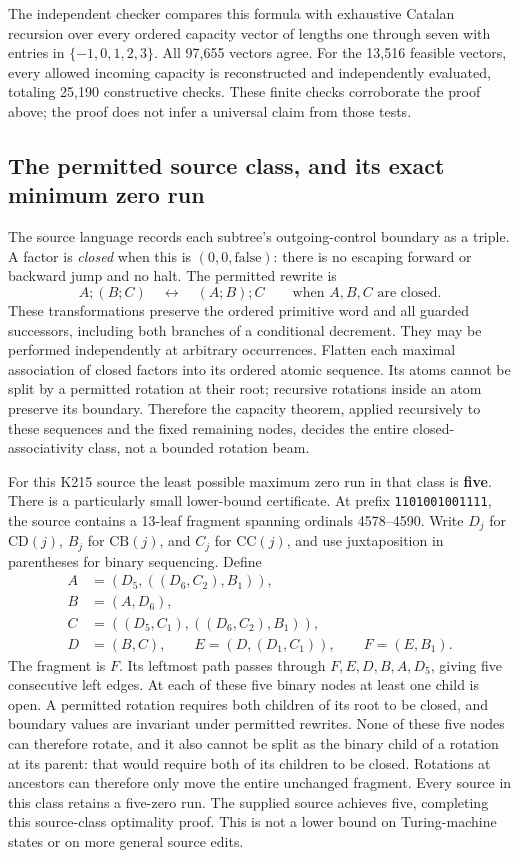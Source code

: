The independent checker compares this formula with exhaustive Catalan
recursion over every ordered capacity vector of lengths one through seven
with entries in $\{-1,0,1,2,3\}$.  All 97,655 vectors agree.  For the 13,516
feasible vectors, every allowed incoming capacity is reconstructed and
independently evaluated, totaling 25,190 constructive checks.  These finite
checks corroborate the proof above; the proof does not infer a universal
claim from those tests.

\subsection{The permitted source class, and its exact minimum zero run}

The source language records each subtree's outgoing-control boundary as a
triple.  A factor is \emph{closed} when this is $(0,0,\mathrm{false})$:
there is no escaping forward or backward jump and no halt.  The permitted
rewrite is
\[
 A;(B;C)\quad\longleftrightarrow\quad(A;B);C
 \qquad\text{when }A,B,C\text{ are closed}.
\]
These transformations preserve the ordered primitive word and all guarded
successors, including both branches of a conditional decrement.  They may
be performed independently at arbitrary occurrences.  Flatten each maximal
association of closed factors into its ordered atomic sequence.  Its atoms
cannot be split by a permitted rotation at their root; recursive rotations
inside an atom preserve its boundary.  Therefore the capacity theorem,
applied recursively to these sequences and the fixed remaining nodes,
decides the entire closed-associativity class, not a bounded rotation beam.

For this K215 source the least possible maximum zero run in that class is
\textbf{five}.  There is a particularly small lower-bound certificate.  At
prefix \texttt{1101001001111}, the source contains a 13-leaf fragment spanning
ordinals 4578--4590.  Write $D_j$ for $\mathrm{CD}(j)$, $B_j$ for
$\mathrm{CB}(j)$, and $C_j$ for $\mathrm{CC}(j)$, and use juxtaposition in
parentheses for binary sequencing.  Define
\[
\begin{aligned}
 A&=(D_5,((D_6,C_2),B_1)),\\
 B&=(A,D_6),\\
 C&=((D_5,C_1),((D_6,C_2),B_1)),\\
 D&=(B,C),\qquad E=(D,(D_1,C_1)),\qquad F=(E,B_1).
\end{aligned}
\]
The fragment is $F$.  Its leftmost path passes through
$F,E,D,B,A,D_5$, giving five consecutive left edges.  At each of these five
binary nodes at least one child is open.  A permitted rotation requires
both children of its root to be closed, and boundary values are invariant
under permitted rewrites.  None of these five nodes can therefore rotate,
and it also cannot be split as the binary child of a rotation at its parent: that would require both of its children to be closed. Rotations at ancestors can therefore only move the entire unchanged fragment.
Every source in this class retains a five-zero run.  The supplied source
achieves five, completing this source-class optimality proof.  This is
not a lower bound on Turing-machine states or on more general source edits.

